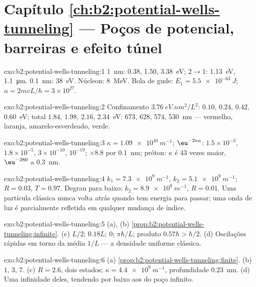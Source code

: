 \section*{Capítulo \ref{ch:b2:potential-wells-tunneling} --- Poços de potencial, barreiras e efeito túnel}

\begin{solution}{exo:b2:potential-wells-tunneling:1}
\qty{1}{nm}: \qty{0.38}{}, \qty{1.50}{}, \qty{3.38}{eV}; $2 \to 1$: \qty{1.13}{eV}, \qty{1.1}{\micro m}.
\qty{0.1}{nm}: \qty{38}{eV}. Núcleon: \qty{8}{MeV}. Bola de gude: $E_1 = \qty{5.5e-63}{J}$;
$n = 2mvL/h = 3 \times 10^{27}$.
\end{solution}

\begin{solution}{exo:b2:potential-wells-tunneling:2}
Confinamento $\qty{3.76}{eV.nm^2}/L^2$: $0.10$, $0.24$, $0.42$, \qty{0.60}{eV}; total
$1.84$, $1.98$, $2.16$, \qty{2.34}{eV}: \qty{673}{}, \qty{628}{}, \qty{574}{}, \qty{530}{nm} ---
vermelho, laranja, amarelo-esverdeado, verde.
\end{solution}

\begin{solution}{exo:b2:potential-wells-tunneling:3}
$\kappa = \qty{1.09e10}{m^{-1}}$; $\eu^{-2\kappa a}$: $1.5 \times 10^{-3}$, $1.8 \times 10^{-5}$,
$3 \times 10^{-10}$, $10^{-19}$; $\times 8.8$ por \qty{0.1}{nm}; próton: $\kappa$ é
$43$ vezes maior, $\eu^{-280}$ a \qty{0.3}{nm}.
\end{solution}

\begin{solution}{exo:b2:potential-wells-tunneling:4}
$k_1 = \qty{7.3e9}{m^{-1}}$, $k_2 = \qty{5.1e9}{m^{-1}}$; $R = 0.03$, $T = 0.97$. Degrau
para baixo: $k_2 = \qty{8.9e9}{m^{-1}}$, $R = 0.01$. Uma partícula clássica nunca
volta atrás quando tem energia para passar; uma onda de luz é parcialmente refletida
em qualquer mudança de índice.
\end{solution}

\begin{solution}{exo:b2:potential-wells-tunneling:5}
(a), (b) \cref{prop:b2:potential-wells-tunneling:infinite}. (c) $L/2$;
$0.18L$; $0$; $\pi\hbar/L$; produto $0.57\hbar > \hbar/2$. (d) Oscilações
rápidas em torno da média $1/L$ --- a densidade uniforme clássica.
\end{solution}

\begin{solution}{exo:b2:potential-wells-tunneling:6}
(a) \cref{prop:b2:potential-wells-tunneling:finite}. (b) $1$, $3$, $7$.
(c) $R = 2.6$, dois estados; $\kappa = \qty{4.4e9}{m^{-1}}$, profundidade \qty{0.23}{nm}. (d)
Uma infinidade deles, tendendo por baixo aos do poço infinito.
\end{solution}

